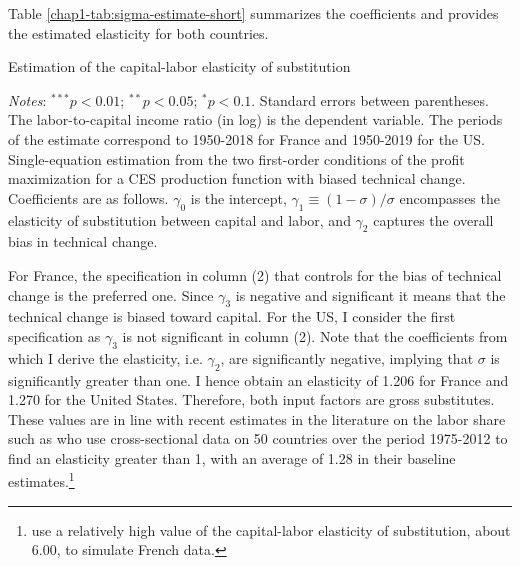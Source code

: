 Table \ref{chap1-tab:sigma-estimate-short} summarizes the coefficients and provides the estimated elasticity for both countries.
\begin{table}[!tb]
    \centering
    \caption{Estimation of the capital-labor elasticity of substitution} \label{chap1-tab:sigma-estimate-short}
    \begin{threeparttable}
        \setlength{\tabcolsep}{12pt}
        
        \begin{tablenotes}[flushleft]
            \footnotesize{\item\textit{Notes}: $^{***}p<0.01$; $^{**}p<0.05$; $^{*}p<0.1$. Standard errors between parentheses. The labor-to-capital income ratio (in log) is the dependent variable. The periods of the estimate correspond to 1950-2018 for France and 1950-2019 for the US. Single-equation estimation from the two first-order conditions of the profit maximization for a CES production function with biased technical change. Coefficients are as follows. $\gamma_0$ is the intercept, $\gamma_1\equiv(1-\sigma)/\sigma$ encompasses the elasticity of substitution between capital and labor, and $\gamma_2$ captures the overall bias in technical change.}
        \end{tablenotes}
    \end{threeparttable}
\end{table}
For France, the specification in column (2) that controls for the bias of technical change is the preferred one. Since $\gamma_3$ is negative and significant it means that the technical change is biased toward capital.
For the US, I consider the first specification as $\gamma_3$ is not significant in column (2). Note that the coefficients from which I derive the elasticity, i.e. $\gamma_2$, are significantly negative, implying that $\sigma$ is significantly greater than one.
I hence obtain an elasticity of 1.206 for France and 1.270 for the United States.
Therefore, both input factors are gross substitutes. These values are in line with recent estimates in the literature on the labor share such as \citet{Karabarbounis2014Global} who use cross-sectional data on 50 countries over the period 1975-2012 to find an elasticity greater than 1, with an average of 1.28 in their baseline estimates.\footnote{\citet{Caballero1998Jobless} use a relatively high value of the capital-labor elasticity of substitution, about 6.00, to simulate French data.}

